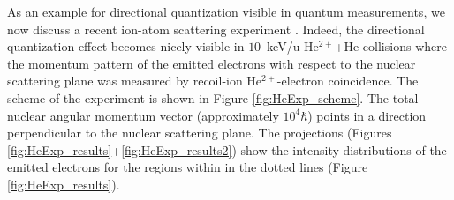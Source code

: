 \documentclass{article}
\begin{document}
As an example for directional quantization visible in quantum measurements, we now discuss a recent ion-atom scattering experiment \citep{SchmidtLEtal2014Vortices}. Indeed, the directional quantization effect becomes nicely visible in $10$~keV/u He$^{2+}$+He collisions where the momentum pattern of the emitted electrons with respect to the nuclear scattering plane was measured by recoil-ion He$^{2+}$-electron coincidence. The scheme of the experiment is shown in Figure \ref{fig:HeExp_scheme}. The total nuclear angular momentum vector (approximately $10^{4}\hbar$) points in a direction perpendicular to the nuclear scattering plane. The projections (Figures \ref{fig:HeExp_results}+\ref{fig:HeExp_results2}) show the intensity distributions of the emitted electrons for the regions within in the dotted lines (Figure \ref{fig:HeExp_results}). 
\end{document}
